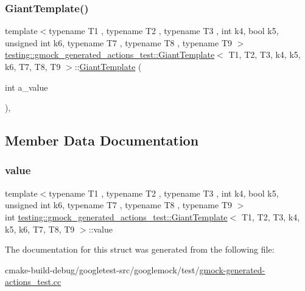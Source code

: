 \subsubsection{\texorpdfstring{GiantTemplate()}{GiantTemplate()}}
{\footnotesize\ttfamily template$<$typename T1 , typename T2 , typename T3 , int k4, bool k5, unsigned int k6, typename T7 , typename T8 , typename T9 $>$ \\
\mbox{\hyperlink{structtesting_1_1gmock__generated__actions__test_1_1GiantTemplate}{testing\+::gmock\+\_\+generated\+\_\+actions\+\_\+test\+::\+Giant\+Template}}$<$ T1, T2, T3, k4, k5, k6, T7, T8, T9 $>$\+::\mbox{\hyperlink{structtesting_1_1gmock__generated__actions__test_1_1GiantTemplate}{Giant\+Template}} (\begin{DoxyParamCaption}\item[{int}]{a\+\_\+value }\end{DoxyParamCaption})\hspace{0.3cm}{\ttfamily [inline]}, {\ttfamily [explicit]}}



\subsection{Member Data Documentation}
\mbox{\label{structtesting_1_1gmock__generated__actions__test_1_1GiantTemplate_afa0f7a8e5ac8c8b7c59d60ad66980856}} 
\subsubsection{\texorpdfstring{value}{value}}
{\footnotesize\ttfamily template$<$typename T1 , typename T2 , typename T3 , int k4, bool k5, unsigned int k6, typename T7 , typename T8 , typename T9 $>$ \\
int \mbox{\hyperlink{structtesting_1_1gmock__generated__actions__test_1_1GiantTemplate}{testing\+::gmock\+\_\+generated\+\_\+actions\+\_\+test\+::\+Giant\+Template}}$<$ T1, T2, T3, k4, k5, k6, T7, T8, T9 $>$\+::value}



The documentation for this struct was generated from the following file\+:\begin{DoxyCompactItemize}
\item 
cmake-\/build-\/debug/googletest-\/src/googlemock/test/\mbox{\hyperlink{gmock-generated-actions__test_8cc}{gmock-\/generated-\/actions\+\_\+test.\+cc}}\end{DoxyCompactItemize}
